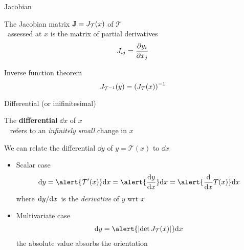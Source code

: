 \documentclass[14pt,dvipsnames]{beamer}
\begin{document}
\begin{frame}{Jacobian}

	The Jacobian matrix $\mathbf J = J_{\mathcal T}(x) $ of  $\mathcal T$ \\
	~assessed at $x$ is the matrix of partial derivatives
	\begin{equation*}
		J_{ij} = \pdv{y_i}{x_j} 
	\end{equation*} 
	
	\pause
	Inverse function theorem
	\begin{equation*}
		J_{{\mathcal T}^{-1}}(y) = \left( J_{\mathcal T}(x) \right)^{-1}
	\end{equation*}
	
\end{frame}

\begin{frame}{Differential (or inifinitesimal)}

	The {\bf differential} $\dd x$ of $x$ \\
	~ refers to an \emph{infinitely small} change in $x$\\ \pause
	\vspace{10pt}

	We can relate the differential $\dd y$ of $y = \mathcal T(x)$ to $\dd x$ \pause
	\begin{itemize}
		\item Scalar case
		\begin{equation*}
			\dd y = \alert{\mathcal T'(x)} \dd x = \alert{\dv{y}{x}} \dd x = \alert{\dv{x}T(x)} \dd x
		\end{equation*}
		where \alert{$\dv*{y}{x}$} is the \emph{derivative} of $y$ wrt $x$ \pause
		\item Multivariate case
		\begin{equation*}
        			\begin{aligned}
			        \dd y = \alert{\djac{\mathcal T}{x}} \dd x %
		        	\end{aligned}
	        	\end{equation*}
		the absolute value absorbs the orientation 
	\end{itemize}

\end{frame}
\end{document}
